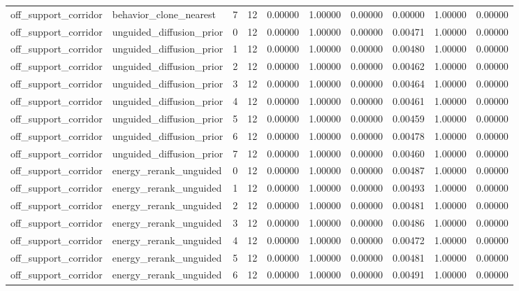 \documentclass{article}
\begin{document}
\begin{table}[tbp]
{\begin{tabular}{llllllllll}
off\_support\_corridor & behavior\_clone\_nearest & 7 & 12 & 0.00000 & 1.00000 & 0.00000 & 0.00000 & 1.00000 & 0.00000 \\
off\_support\_corridor & unguided\_diffusion\_prior & 0 & 12 & 0.00000 & 1.00000 & 0.00000 & 0.00471 & 1.00000 & 0.00000 \\
off\_support\_corridor & unguided\_diffusion\_prior & 1 & 12 & 0.00000 & 1.00000 & 0.00000 & 0.00480 & 1.00000 & 0.00000 \\
off\_support\_corridor & unguided\_diffusion\_prior & 2 & 12 & 0.00000 & 1.00000 & 0.00000 & 0.00462 & 1.00000 & 0.00000 \\
off\_support\_corridor & unguided\_diffusion\_prior & 3 & 12 & 0.00000 & 1.00000 & 0.00000 & 0.00464 & 1.00000 & 0.00000 \\
off\_support\_corridor & unguided\_diffusion\_prior & 4 & 12 & 0.00000 & 1.00000 & 0.00000 & 0.00461 & 1.00000 & 0.00000 \\
off\_support\_corridor & unguided\_diffusion\_prior & 5 & 12 & 0.00000 & 1.00000 & 0.00000 & 0.00459 & 1.00000 & 0.00000 \\
off\_support\_corridor & unguided\_diffusion\_prior & 6 & 12 & 0.00000 & 1.00000 & 0.00000 & 0.00478 & 1.00000 & 0.00000 \\
off\_support\_corridor & unguided\_diffusion\_prior & 7 & 12 & 0.00000 & 1.00000 & 0.00000 & 0.00460 & 1.00000 & 0.00000 \\
off\_support\_corridor & energy\_rerank\_unguided & 0 & 12 & 0.00000 & 1.00000 & 0.00000 & 0.00487 & 1.00000 & 0.00000 \\
off\_support\_corridor & energy\_rerank\_unguided & 1 & 12 & 0.00000 & 1.00000 & 0.00000 & 0.00493 & 1.00000 & 0.00000 \\
off\_support\_corridor & energy\_rerank\_unguided & 2 & 12 & 0.00000 & 1.00000 & 0.00000 & 0.00481 & 1.00000 & 0.00000 \\
off\_support\_corridor & energy\_rerank\_unguided & 3 & 12 & 0.00000 & 1.00000 & 0.00000 & 0.00486 & 1.00000 & 0.00000 \\
off\_support\_corridor & energy\_rerank\_unguided & 4 & 12 & 0.00000 & 1.00000 & 0.00000 & 0.00472 & 1.00000 & 0.00000 \\
off\_support\_corridor & energy\_rerank\_unguided & 5 & 12 & 0.00000 & 1.00000 & 0.00000 & 0.00481 & 1.00000 & 0.00000 \\
off\_support\_corridor & energy\_rerank\_unguided & 6 & 12 & 0.00000 & 1.00000 & 0.00000 & 0.00491 & 1.00000 & 0.00000 \\

\end{tabular}}
\end{table}
\end{document}
